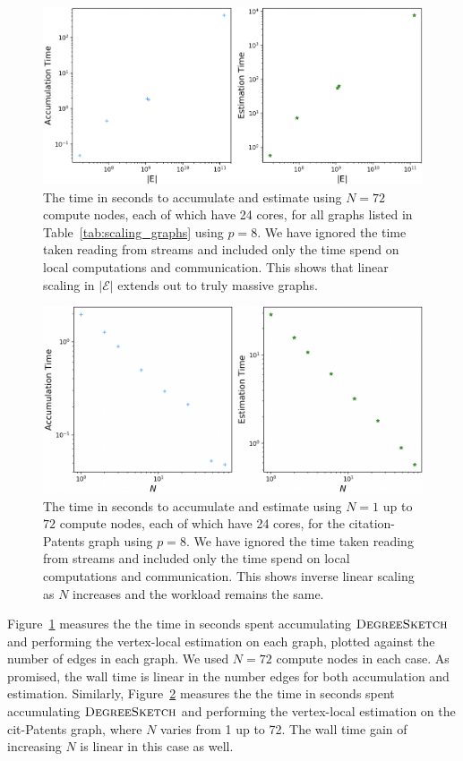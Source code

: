 \documentclass[10]{report}
\newcommand{\algoname}[1]{\textnormal{\textsc{#1}}}
\begin{document}
\begin{figure}
	\centerline{\includegraphics[width=0.8\columnwidth]{ds_scaling}}
	\caption{The time in seconds to accumulate and estimate using $N=72$ compute nodes, each of which have 24 cores, for all graphs listed in Table~\ref{tab:scaling_graphs} using $p=8$.
	We have ignored the time taken reading from streams and included only the time spend on local computations and communication.
	This shows that linear scaling in $|\mathcal{E}|$ extends out to truly massive graphs.
	\label{fig:ds_scaling}}
\end{figure}

\begin{figure}
	\centerline{\includegraphics[width=0.8\columnwidth]{patents_scaling}}
	\caption{The time in seconds to accumulate and estimate using $N=1$ up to $72$ compute nodes, each of which have 24 cores, for the citation-Patents graph using $p=8$.
	We have ignored the time taken reading from streams and included only the time spend on local computations and communication.
	This shows inverse linear scaling as $N$ increases and the workload remains the same.
	\label{fig:patents_scaling}}
\end{figure}

Figure~\ref{fig:ds_scaling} measures the the time in seconds spent accumulating $\algoname{DegreeSketch}$ and performing the vertex-local estimation on each graph, plotted against the number of edges in each graph. 
We used $N=72$ compute nodes in each case. 
As promised, the wall time is linear in the number edges for both accumulation and estimation.
Similarly, Figure~\ref{fig:patents_scaling} measures the the time in seconds spent accumulating $\algoname{DegreeSketch}$ and performing the vertex-local estimation on the cit-Patents graph, where $N$ varies from 1 up to 72. 
The wall time gain of increasing $N$ is linear in this case as well. 
\end{document}
